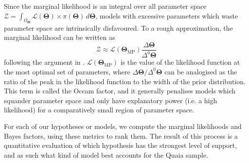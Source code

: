 \documentclass[fleqn,usenatbib]{mnras}
\begin{document}
            Since the marginal likelihood is an integral over all parameter space $\mathcal{Z} = \int_{\Omega_{\mathbf{\Theta}}} \mathcal{L}(\mathbf{\Theta}) \times \pi(\mathbf{\Theta}) \, d \mathbf{\Theta}$, models with excessive parameters which waste parameter space are intrinsically disfavoured.
            To a rough approximation, the marginal likelihood can be written as
            \begin{equation}
                \mathcal{Z} \approx \mathcal{L}(\mathbf{\Theta}_{\text{MP}}) \frac{\Delta \mathbf{\Theta}}{\Delta^0 \mathbf{\Theta}}
            \end{equation}
            following the argument in \citet{mackay2003}. $\mathcal{L}(\mathbf{\Theta}_{\text{MP}})$ is the value of the likelihood function at the most optimal set of parameters, where $\Delta \mathbf{\Theta} / \Delta^0 \mathbf{\Theta}$ can be analogised as the ratio of the peak in the likelihood function to the width of the prior distribution.
            This term is called the Occam factor, and it generally penalises models which squander parameter space and only have explanatory power (i.e. a high likelihood) for a comparatively small region of parameter space.
            
            For each of our hypotheses or models, we compute the marginal likelihoods and Bayes factors, using these metrics to rank them.
            The result of this process is a quantitative evaluation of which hypothesis has the strongest level of support, and as such what kind of model best accounts for the Quaia sample.
    
\end{document}
